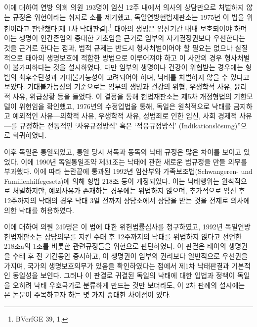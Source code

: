 이에 대하여 연방 의회 의원 193명이 임신 12주 내에서 의사의 상담만으로 처벌하지 않는 규정은 위헌이라는 취지로 소를 제기했고, 독일연방헌법재판소는 1975년 이 법을 위헌이라고 판단했다{[}제 1차 낙태판결{]}.\footnote{BVerfGE 39, 1.} 태아의 생명은 임신기간 내내 보호되어야 하며 이는 생명이 인간존엄의 중대한 기초임을 근거로 임부의 자기결정권보다 우선한다는 것을 근거로 한다는 점과, 법적 규제는 반드시 형사처벌이어야 할 필요는 없으나 실질적으로 태아의 생명보호에 적합한 방법으로 이루어져야 하고 이 사안의 경우 형사처벌이 불가피하다는 것을 설시하였다. 다만 임부의 생명이나 건강이 위협받는 경우에는 형법의 최후수단성과 기대불가능성이 고려되어야 하며, 낙태를 처벌하지 않을 수 있다고 보았다. 기대불가능성의 기준으로는 임부의 생명과 건강의 위협, 우생학적 사유, 윤리적 사유, 위급상황 등을 들었다. 이 결정을 통해 헌법재판소는 제5차 개정형법의 기한모델이 위헌임을 확인했고, 1976년의 수정입법을 통해, 독일은 원칙적으로 낙태를 금지하고 예외적인 사유---의학적 사유, 우생학적 사유, 성범죄로 인한 임신, 사회 경제적 사유---를 규정하는 전통적인 `사유규정방식' 혹은 `적응규정방식' (Indikationslösung)''으로 회귀하였다.

이후 독일은 통일되었고, 통일 당시 서독과 동독의 낙태 규정은 많은 차이를 보이고 있었다. 이에 1990년 독일통일조약 제31조는 낙태에 관한 새로운 법규정을 만들 의무를 부과했다. 이에 따라 논란끝에 통과된 1992년 임산부와 가족보조법(Schwangeren- und Familienhilfegesetz)에 의해 형법 218조 등이 개정되었다. 이는 낙태행위는 원칙적으로 처벌하지만, 예외사유가 존재하는 경우에는 위법하지 않으며, 추가적으로 임신 후 12주까지의 낙태의 경우 낙태 3일 전까지 상담소에서 상담을 받는 것을 전제로 의사에 의한 낙태를 허용하였다.

이에 대하여 의원 249명은 이 법에 대한 위헌법률심사를 청구하였고, 1992년 독일연방헌법재판소는 상담의무를 지킨 수태 후 12주까지의 낙태를 위법하지 않다고 선언한 218조a의 1조를 비롯한 관련규정들을 위헌으로 판단하였다. 이 판결은 태아의 생명권을 수태 후 전 기간동안 중시하고, 이 생명권이 임부의 권리보다 일반적으로 우선권을 가지며, 국가의 생명보호의무가 있음을 확인하였다는 점에서 제1차 낙태판결과 기본적인 동일성을 보인다. 그러나 이 판결로 귀결된 독일의 낙태에 대한 입법과 정책이 독일을 오히려 낙태 우호국가로 분류하게 만드는 것만 보더라도, 이 2차 판례의 설시에는 본 논문이 주목하고자 하는 몇 가지 중대한 차이점이 있다.


